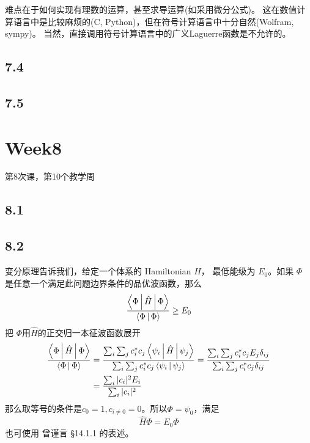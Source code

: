 难点在于如何实现有理数的运算，甚至求导运算(如采用微分公式)。
这在数值计算语言中是比较麻烦的(C, Python)，但在符号计算语言中十分自然(Wolfram, sympy)。
当然，直接调用符号计算语言中的广义Laguerre函数是不允许的。

\subsection{7.4}

\subsection{7.5}

\section{Week8}
第8次课，第10个教学周
\subsection{8.1}
\subsection{8.2}
变分原理告诉我们，给定一个体系的 Hamiltonian $\hat H$，%
最低能级为 $E_0$。如果 $\Phi$ 是任意一个满足此问题边界条件的品优波函数，那么
\begin{equation}
	\dfrac{\Braket{ \Phi | \hat H | \Phi }}{\Braket{ \Phi | \Phi }} \geq E_0
\end{equation}
把 $ \Phi $用$\hat H$的正交归一本征波函数展开
\begin{align}
	\dfrac{\Braket{ \Phi | \hat H | \Phi }}{\Braket{ \Phi | \Phi }} &= \dfrac{\sum_i\sum_j c_i^* c_j \Braket{\psi_i | \hat H | \psi_j}}{\sum_i\sum_j c_i^* c_j \Braket{\psi_i |  \psi_j}} 
	= \dfrac{\sum_i\sum_j c_i^* c_j E_j \delta_{ij}}{\sum_i \sum_j c_i^* c_j \delta_{ij}} \notag\\
	&= \dfrac{ \sum_i |c_i|^2 E_i }{\sum_i  |c_i|^2} 
\end{align}
那么取等号的条件是$ c_0 = 1, c_{i\neq 0} = 0$。所以$ \Phi = \psi_0 $，满足
\begin{equation}
	\hat H \Phi = E_0 \Phi
\end{equation}
也可使用 曾谨言 \S 14.1.1 的表述。


